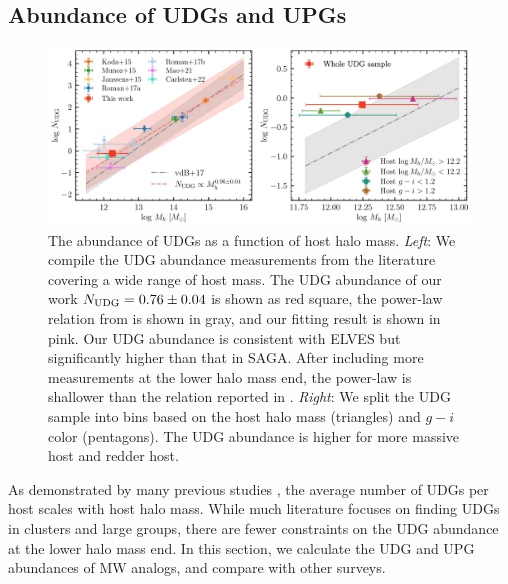 \documentclass[twocolumn,astrosymb,twocolappendix]{aastex631}
\begin{document}
\begin{CJK*}{UTF8}{gbsn}

\subsection{Abundance of UDGs and UPGs}\label{sec:n_udg}

\begin{figure}
	\vbox{ 
		\centering
		\includegraphics[width=1\linewidth]{N_UDG_host_mass.pdf}
	}
    \caption{The abundance of UDGs as a function of host halo mass. \textit{Left}: We compile the UDG abundance measurements from the literature covering a wide range of host mass. The UDG abundance of our work $N_{\rm UDG} = 0.76\pm 0.04$ is shown as red square, the power-law relation from \citet{vdBurg2017} is shown in gray, and our fitting result is shown in pink. Our UDG abundance is consistent with ELVES but significantly higher than that in SAGA. After including more measurements at the lower halo mass end, the power-law is shallower than the relation reported in \citet{vdBurg2017}. \textit{Right}: We split the UDG sample into bins based on the host halo mass (triangles) and $g-i$ color (pentagons). The UDG abundance is higher for more massive host and redder host. }
    \label{fig:n_udg}
\end{figure}

As demonstrated by many previous studies \citep[e.g.,][]{vdBurg2016,vdBurg2017,Roman2017a}, the average number of UDGs per host scales with host halo mass. While much literature focuses on finding UDGs in clusters and large groups, there are fewer constraints on the UDG abundance at the lower halo mass end. In this section, we calculate the UDG and UPG abundances of MW analogs, and compare with other surveys.


\end{CJK*}
\end{document}
